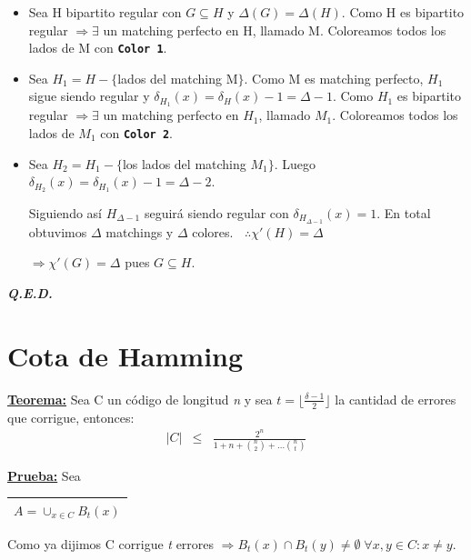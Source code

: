 \documentclass[12pt,a4paper]{report}
\newcounter{neq}
\newcommand{\QED}{\hfill \textit{\textbf{Q.E.D.}}}
\begin{document}
			\pagebreak
			\begin{itemize}
				\item Sea H bipartito regular con $G \subseteq H$ y $\Delta(G) = \Delta(H)$. Como H es bipartito regular $\Rightarrow \exists$ un matching perfecto en H, llamado M. Coloreamos todos los lados de M con \textbf{\texttt{Color 1}}.
				\item Sea $H_{1} = H - \lbrace$lados del matching M$\rbrace$. Como M es matching perfecto, $H_{1}$ sigue siendo regular y $\delta_{H_{1}}(x) = \delta_{H}(x) - 1 = \Delta - 1$. Como $H_{1}$ es bipartito regular $\Rightarrow \exists$ un matching perfecto en $H_{1}$, llamado $M_{1}$. Coloreamos todos los lados de $M_{1}$ con \textbf{\texttt{Color 2}}.
				\item Sea $H_{2} = H_{1} - \lbrace$los lados del matching $M_{1} \rbrace$. Luego $\delta_{H_{2}}(x) = \delta_{H_{1}}(x) - 1 = \Delta - 2$.
					\par Siguiendo así $H_{\Delta - 1}$ seguirá siendo regular con $ \delta_{H_{\Delta - 1}}(x) = 1$. En total obtuvimos $ \Delta $ matchings y $ \Delta $ colores. $\; \; \therefore \chi '(H) = \Delta$
					\begin{center}
						$\Rightarrow \chi ' (G) = \Delta$ pues $G \subseteq H$.
					\end{center}
			\end{itemize}

		\QED

	\pagebreak
	\section{Cota de Hamming}
		\textbf{\underline{Teorema:}} Sea C un código de longitud \textit{n} y sea $ t = \lfloor \frac{\delta - 1}{2} \rfloor$ la cantidad de errores que corrigue, entonces:
			\begin{eqnarray}
				\nonumber \lvert C \rvert &\leq & \frac{2^{n}}{1 + n + {n \choose 2} + \dotsc {n \choose t}}
			\end{eqnarray}

		\textbf{\underline{Prueba:}} Sea \begin{tabular}{|c|} \hline $ A = \cup_{x \in C} B_{t}(x) $ \\ \hline \end{tabular}

			\vspace{3mm}
				\par Como ya dijimos C corrigue \textit{t} errores $\Rightarrow B_{t}(x) \cap B_{t}(y) \neq \emptyset \; \forall x, y \in C : x \neq y$.
\end{document}
